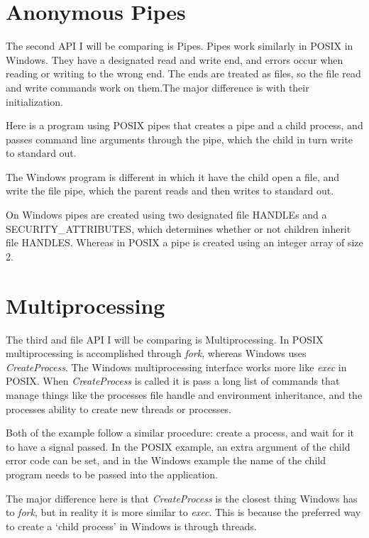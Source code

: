\documentclass[letterpaper,10pt]{article}
\begin{document}
\section{Anonymous Pipes}

The second API I will be comparing is Pipes. Pipes work similarly in
POSIX in Windows. They have a designated read and write end, and errors
occur when reading or writing to the wrong end. The ends are treated as
files, so the file read and write commands work on them.The major
difference is with their initialization.

Here is a program using POSIX pipes that creates a pipe and a child
process, and passes command line arguments through the pipe, which the
child in turn write to standard out.

The Windows program is different in which it have the child open a
file, and write the file pipe, which the parent reads and then writes to
standard out.




On Windows pipes are created using two designated file HANDLEs and a
SECURITY\_ATTRIBUTES, which determines whether or not children inherit
file HANDLES. Whereas in POSIX a pipe is created using an integer array
of size 2.

\section{Multiprocessing}

The third and file API I will be comparing is Multiprocessing. In POSIX
multiprocessing is accomplished through \emph{fork}, whereas Windows
uses \emph{CreateProcess}. The Windows multiprocessing interface works
more like \emph{exec} in POSIX. When \emph{CreateProcess} is called it
is pass a long list of commands that manage things like the processes
file handle and environment inheritance, and the processes ability to
create new threads or processes.

Both of the example follow a similar procedure: create a process, and
wait for it to have a signal passed. In the POSIX example, an extra
argument of the child error code can be set, and in the Windows example
the name of the child program needs to be passed into the application.




The major difference here is that \emph{CreateProcess} is the closest
thing Windows has to \emph{fork}, but in reality it is more similar to
\emph{exec}. This is because the preferred way to create a `child
process' in Windows is through threads.
\end{document}
